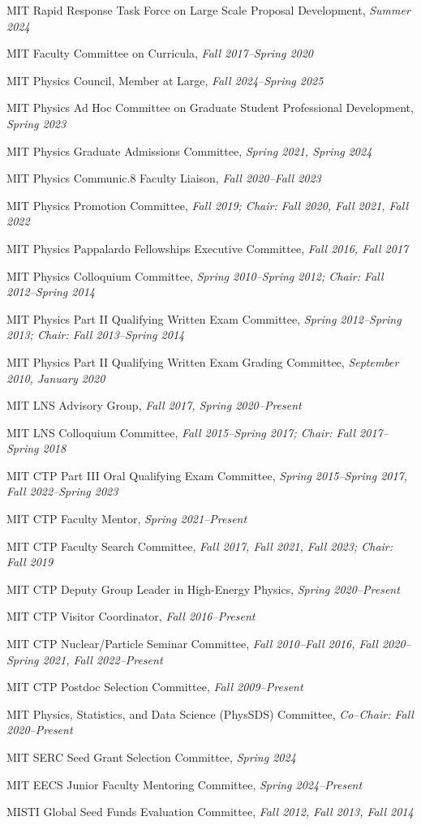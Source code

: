 \bbl
\item MIT Rapid Response Task Force on Large Scale Proposal Development, \emph{Summer 2024}
\item MIT Faculty Committee on Curricula, \emph{Fall 2017--Spring 2020}
\item MIT Physics Council, Member at Large, \emph{Fall 2024--Spring 2025}
\item MIT Physics Ad Hoc Committee on Graduate Student Professional Development, \emph{Spring 2023}
\item MIT Physics Graduate Admissions Committee, \emph{Spring 2021, Spring 2024}
\item MIT Physics Communic.8 Faculty Liaison, \emph{Fall 2020--Fall 2023}
\item MIT Physics Promotion Committee, \emph{Fall 2019; Chair: Fall 2020, Fall 2021, Fall 2022}
\item MIT Physics Pappalardo Fellowships Executive Committee, \emph{Fall 2016, Fall 2017}
\item MIT Physics Colloquium Committee, \emph{Spring 2010--Spring 2012; Chair: Fall 2012--Spring 2014}
\item MIT Physics Part II Qualifying Written Exam Committee, \emph{Spring 2012--Spring 2013; Chair: Fall 2013--Spring 2014}
\item MIT Physics Part II Qualifying Written Exam Grading Committee, \emph{September 2010, January 2020}
\item MIT LNS Advisory Group, \emph{Fall 2017, Spring 2020--Present}
\item MIT LNS Colloquium Committee, \emph{Fall 2015--Spring 2017; Chair: Fall 2017--Spring 2018}
\item MIT CTP Part III Oral Qualifying Exam Committee, \emph{Spring 2015--Spring 2017, Fall 2022--Spring 2023}
\item MIT CTP Faculty Mentor, \emph{Spring 2021--Present}
\item MIT CTP Faculty Search Committee, \emph{Fall 2017, Fall 2021, Fall 2023; Chair: Fall 2019}
\item MIT CTP Deputy Group Leader in High-Energy Physics, \emph{Spring 2020--Present}
\item MIT CTP Visitor Coordinator, \emph{Fall 2016--Present}
\item MIT CTP Nuclear/Particle Seminar Committee, \emph{Fall 2010--Fall 2016, Fall 2020--Spring 2021, Fall 2022--Present}
\item MIT CTP Postdoc Selection Committee, \emph{Fall 2009--Present}
\item MIT Physics, Statistics, and Data Science (PhysSDS) Committee, \emph{Co--Chair: Fall 2020--Present}
\item MIT SERC Seed Grant Selection Committee, \emph{Spring 2024}
\item MIT EECS Junior Faculty Mentoring Committee, \emph{Spring 2024--Present}
\item MISTI Global Seed Funds Evaluation Committee, \emph{Fall 2012, Fall 2013, Fall 2014}
\el
